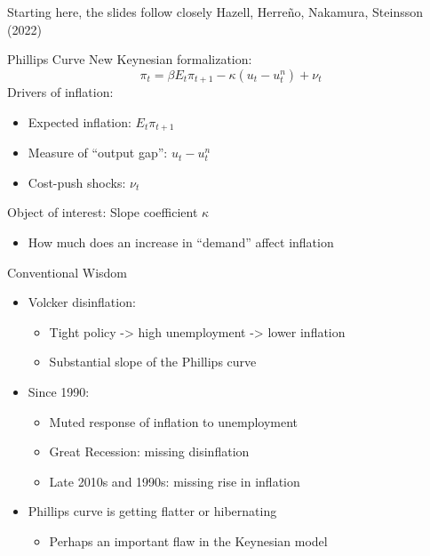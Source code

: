 \documentclass[11pt,aspectratio=169,xcolor={dvipsnames},hyperref={pdftex,pdfpagemode=UseNone,hidelinks,pdfdisplaydoctitle=true},usepdftitle=false]{beamer}
\begin{document}
\begin{frame}
\begin{center}
\begin{LARGE}
Starting here, the slides follow closely Hazell, Herre\~no, Nakamura, Steinsson (2022)
\end{LARGE}
\end{center}
\end{frame}



\begin{frame}{Phillips Curve}
	New Keynesian formalization:
	\[ \pi_{t} = \beta E_{t} \pi_{t+1} - \kappa (u_{t} - u_{t}^{n} ) + \nu_{t} \]
	Drivers of inflation:
	\begin{itemize}
		\item Expected inflation: $E_{t} \pi_{t+1}$
		\item Measure of ``output gap'': $u_{t} - u_{t}^{n}$
		\item Cost-push shocks: $\nu_t$
	\end{itemize}
	\vspace{10pt}
	\vspace{10pt}
	Object of interest: Slope coefficient $\kappa$
	\begin{itemize}
		\item How much does an increase in ``demand'' affect inflation 
	\end{itemize}
\end{frame}


\begin{frame}{Conventional Wisdom}
	\begin{itemize}
		\itemsep1em 
		\item Volcker disinflation:
		\begin{itemize}
			\item Tight policy -> high unemployment -> lower inflation
			\item Substantial slope of the Phillips curve
		\end{itemize} 
		\item Since 1990:
		\begin{itemize}
			\item Muted response of inflation to unemployment
			\item Great Recession: missing disinflation 
			\item Late 2010s and 1990s: missing rise in inflation
		\end{itemize}
		\item Phillips curve is getting flatter or hibernating
		\begin{itemize}
			\item Perhaps an important flaw in the Keynesian model
		\end{itemize}
	\end{itemize}
\end{frame}
\end{document}
